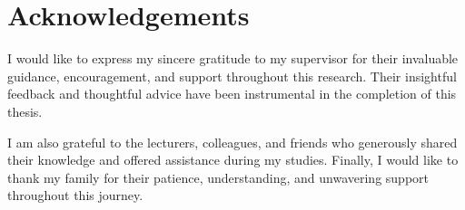 \chapter*{Acknowledgements}
\label{thanks}

I would like to express my sincere gratitude to my supervisor for their invaluable guidance, encouragement, and support throughout this research. Their insightful feedback and thoughtful advice have been instrumental in the completion of this thesis.

I am also grateful to the lecturers, colleagues, and friends who generously shared their knowledge and offered assistance during my studies. Finally, I would like to thank my family for their patience, understanding, and unwavering support throughout this journey.